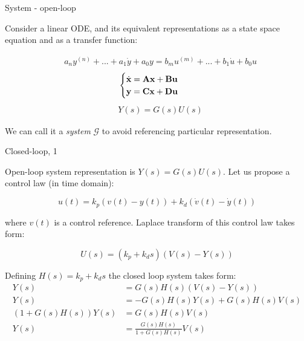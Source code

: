 \documentclass{beamer}
\begin{document}
\begin{frame}{System - open-loop}
	\begin{flushleft}
		
		Consider a linear ODE, and its equivalent representations as a state space equation and as a transfer function:
		
		\begin{align}
			&a_n y^{(n)} + ... + a_1 \dot y + a_0 y = b_m u^{(m )}+ ... + b_1 \dot u + b_0 u
		\end{align}
		\begin{align}
			&\begin{cases}
				\dot{\mathbf{x}} = \mathbf{A}\mathbf{x} + \mathbf{B}\mathbf{u} \\
				\mathbf{y}  = \mathbf{C}\mathbf{x} + \mathbf{D}\mathbf{u}
			\end{cases}
		\end{align}
		\begin{align}
			&Y(s)  = G(s) U(s)
		\end{align}
		
		We can call it a \emph{system} $\mathcal{G}$ to avoid referencing particular representation.
		
	\end{flushleft}
\end{frame}



\begin{frame}{Closed-loop, 1}
	\begin{flushleft}
		
		Open-loop system representation is $Y(s)  = G(s) U(s)$. Let us propose a control law (in time domain):
		
		\begin{equation}
			u(t) = k_p (v(t) - y(t)) + k_d (\dot v(t) - \dot y(t))
		\end{equation}
	
		where $v(t)$ is a control reference. Laplace transform of this control law takes form:
		
		\begin{equation}
			U(s) = (k_p + k_d s) (V(s) - Y(s))
		\end{equation}
		
		Defining $H(s) = k_p + k_d s$ the closed loop system takes form:
		\begin{align}
			Y(s)  &= G(s) H(s) (V(s) - Y(s)) \\
			Y(s)  &= -G(s) H(s) Y(s) + G(s) H(s)V(s) \\
		    (1 + G(s) H(s)) Y(s) &=  G(s) H(s)V(s) \\
		    Y(s) &= \frac{G(s) H(s)}{1 + G(s) H(s)} V(s)
		\end{align}
		
		
	\end{flushleft}
\end{frame}
\end{document}
